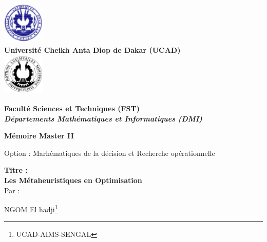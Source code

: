 \documentclass[a4paper,11pt,oneside]{report}
\theoremstyle{plain}
\newcommand{\0}{/ \! \! \! 0}
\theoremstyle{plain}
\begin{document}
\dominitoc

\begin{titlepage}
\begin{center}
\includegraphics[height=2cm,width=2cm]{UcadLogo} \\ 
{\bf Universit\'e Cheikh Anta Diop de Dakar (UCAD)} \\
\includegraphics[height=2cm,width=2cm]{logo}

\vspace{0.2cm}
{\bf Facult\'e Sciences et Techniques (FST)}\\
\vspace{0.2cm}
{{\bf\it D\'epartements Math\'ematiques et Informatiques (DMI)\\}}
\end{center}


\vspace{1.2cm}

\begin{center}

{\bf M\'emoire Master II \\
\vskip 0.2cm 

Option : Marh\'ematiques de la d\'ecision et Recherche op\'erationnelle\\}

\vspace{1.5cm}
{\bf Titre :\\}
{\Large\bf Les M\'etaheuristiques en Optimisation\\ }
\vspace{0.5cm}
Par :

\vspace{1cm}

NGOM El hadji\footnote{UCAD-AIMS-SENGAL}\\

\vspace{1cm}


\end{center}
\end{titlepage}
\end{document}
